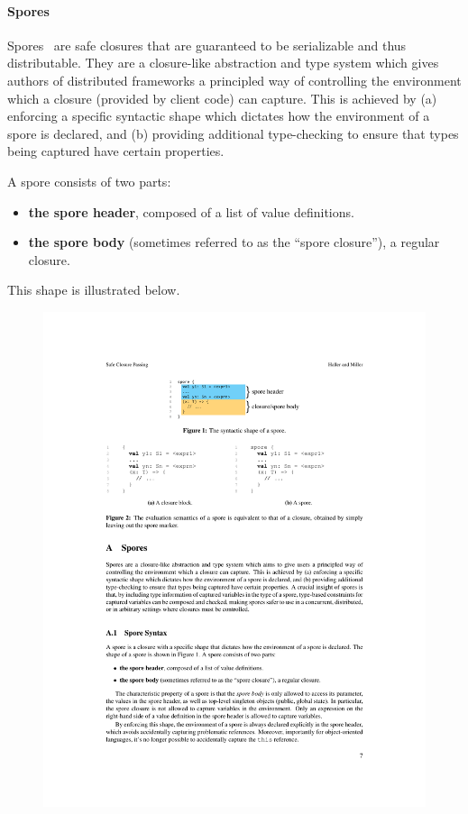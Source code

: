 \documentclass[10pt]{sigplanconf}
\theoremstyle{definition}
\theoremstyle{definition}
\begin{document}
\paragraph{Spores}

Spores~\cite{Spores} are safe closures that are guaranteed to be serializable
and thus distributable. They are a closure-like abstraction and type system
which gives authors of distributed frameworks a principled way of controlling
the environment which a closure (provided by client code) can capture. This is
achieved by (a) enforcing a specific syntactic shape which dictates how the
environment of a spore is declared, and (b) providing additional type-checking
to ensure that types being captured have certain properties.

\vspace{3mm}
\noindent A spore consists of two parts:

\begin{itemize}[noitemsep]
\item {\bf the spore header}, composed of a list of value definitions.
\item {\bf the spore body} (sometimes referred to as the “spore closure”), a
  regular closure.
\end{itemize}

\noindent This shape is illustrated below.

\begin{figure}[h!]
\centering\includegraphics[width=0.75\columnwidth]{spore-shape.pdf}
\end{figure}
\end{document}
